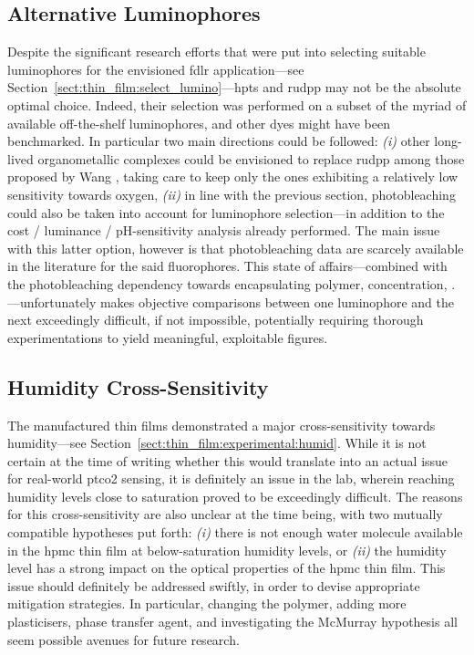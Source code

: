 \subsection{Alternative Luminophores}

Despite the significant research efforts that were put into selecting suitable luminophores for the envisioned \gls{fdlr} application---see Section~\ref{sect:thin_film:select_lumino}---\gls{hpts} and \gls{rudpp} may not be the absolute optimal choice. Indeed, their selection was performed on a subset of the myriad of available off-the-shelf luminophores, and other dyes might have been benchmarked. In particular two main directions could be followed: \textit{(i)} other long-lived organometallic complexes could be envisioned to replace \gls{rudpp} among those proposed by Wang \etal{}\cite[Sect.~6.2]{wang2014wolfbeis}, taking care to keep only the ones exhibiting a relatively low sensitivity towards oxygen, \textit{(ii)} in line with the previous section, photobleaching could also be taken into account for luminophore selection---in addition to the cost / luminance / pH-sensitivity analysis already performed. The main issue with this latter option, however is that photobleaching data are scarcely available in the literature for the said fluorophores. This state of affairs---combined with the photobleaching dependency towards encapsulating polymer, concentration, \etc.---unfortunately makes objective comparisons between one luminophore and the next exceedingly difficult, if not impossible, potentially requiring thorough experimentations to yield meaningful, exploitable figures.

\subsection{Humidity Cross-Sensitivity}\label{sect:conclusion:humidity}

The manufactured thin films demonstrated a major cross-sensitivity towards humidity---see Section~\ref{sect:thin_film:experimental:humid}. While it is not certain at the time of writing whether this would translate into an actual issue for real-world \gls{ptco2} sensing, it is definitely an issue in the lab, wherein reaching humidity levels close to saturation proved to be exceedingly difficult. The reasons for this cross-sensitivity are also unclear at the time being, with two mutually compatible hypotheses put forth: \textit{(i)} there is not enough water molecule available in the \gls{hpmc} thin film at below-saturation humidity levels, or \textit{(ii)} the humidity level has a strong impact on the optical properties of the \gls{hpmc} thin film. This issue should definitely be addressed swiftly, in order to devise appropriate mitigation strategies. In particular, changing the polymer, adding more plasticisers, phase transfer agent, and investigating the McMurray hypothesis all seem possible avenues for future research.

